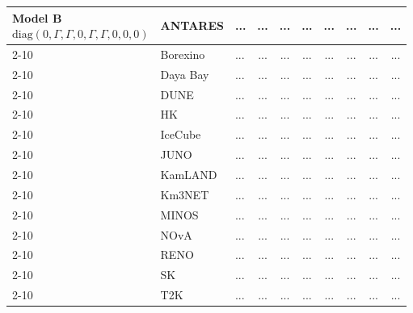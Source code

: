 \begin{table}[H]
{\begin{tabular}{|l|l|l||c|c|c|c|c|c|c|}
\multirow{3}{*}{\parbox{3.2cm}{\centering 
Model B \\[0.5ex]
\scriptsize $\mathrm{diag}(0, \Gamma, \Gamma, 0, \Gamma, \Gamma, 0, 0, 0)$}}
        & ANTARES          & ... & ... & ... & ... & ... & ... & ... & ... \\ \cline{2-10}
        & Borexino         & ... & ... & ... & ... & ... & ... & ... & ... \\ \cline{2-10}
        & Daya Bay         & ... & ... & ... & ... & ... & ... & ... & ... \\ \cline{2-10}
        & DUNE             & ... & ... & ... & ... & ... & ... & ... & ... \\ \cline{2-10}
        & HK               & ... & ... & ... & ... & ... & ... & ... & ... \\ \cline{2-10}
        & IceCube          & ... & ... & ... & ... & ... & ... & ... & ... \\ \cline{2-10}
        & JUNO             & ... & ... & ... & ... & ... & ... & ... & ... \\ \cline{2-10}
        & KamLAND          & ... & ... & ... & ... & ... & ... & ... & ... \\ \cline{2-10}
        & Km3NET           & ... & ... & ... & ... & ... & ... & ... & ... \\ \cline{2-10}
        & MINOS            & ... & ... & ... & ... & ... & ... & ... & ... \\ \cline{2-10}
        & NOvA             & ... & ... & ... & ... & ... & ... & ... & ... \\ \cline{2-10}
        & RENO             & ... & ... & ... & ... & ... & ... & ... & ... \\ \cline{2-10}
        & SK               & ... & ... & ... & ... & ... & ... & ... & ... \\ \cline{2-10}
        & T2K              & ... & ... & ... & ... & ... & ... & ... & ... \\ \hline \hline
\end{tabular}
} %
\end{table}

